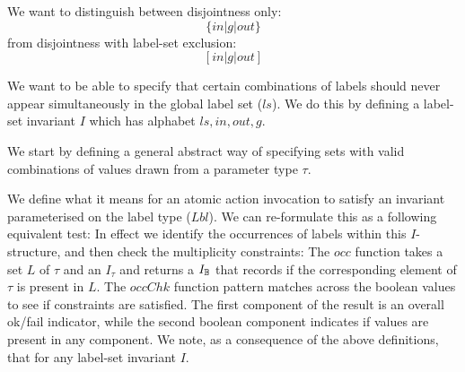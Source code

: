 We want to distinguish between disjointness only:
\[ \{ in | g | out \} \]
from disjointness with label-set exclusion:
\[ [ in | g | out ] \]

We want to be able to specify that certain combinations
of labels should never appear simultaneously
in the global label set ($ls$).
We do this by defining a label-set invariant $I$
which has alphabet $ls,in,out,g$.

We start by defining a general abstract way of specifying
sets with valid combinations
of values drawn from a parameter type $\tau$.

We define what it means for an atomic action invocation
to satisfy an invariant parameterised on the label type ($Lbl$).
We can re-formulate this as a following equivalent test:
In effect we identify the occurrences of labels within this $I$-structure,
and then check the multiplicity constraints:
The $occ$ function takes a set $L$ of $\tau$ and an $I_\tau$ and returns a $I_{\mathbb{B}}$
that records if the corresponding element of $\tau$ is present in $L$.
The $occChk$ function pattern matches across the boolean values to see if
constraints are satisfied.
The first component of the result is an overall ok/fail indicator,
while the second boolean component indicates if values are present
in any component.
We note, as a consequence of the above definitions, that
for any label-set invariant $I$.

